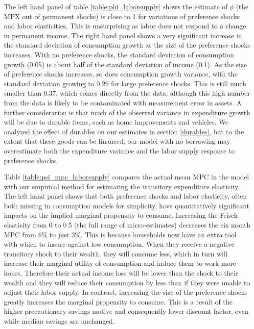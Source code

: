 \documentclass[titlepage]{\econtex}\newcommand{\texname}{ConsumptionHeterogeneity}
\begin{document}
The left hand panel of table \ref{table:phi_laborsupply} shows the estimate of $\phi$ (the MPX out of permanent shocks) is close to 1 for variations of preference shocks and labor elasticities. This is unsurprising as labor does not respond to a change in permanent income. The right hand panel shows a very significant increase in the standard deviation of consumption growth as the size of the preference shocks increases. With no preference shocks, the standard deviation of consumption growth (0.05) is about half of the standard deviation of income (0.1). As the size of preference shocks increases, so does consumption growth variance, with the standard deviation growing to 0.26 for large preference shocks. This is still much smaller than 0.37, which comes directly from the data, although this high number from the data is likely to be contaminated with measurement error in assets. A further consideration is that much of the observed variance in expenditure growth will be due to durable items, such as home improvements and vehicles. We analyzed the effect of durables on our estimates in section \ref{durables}, but to the extent that these goods can be financed, our model with no borrowing may overestimate both the expenditure variance and the labor supply response to preference shocks.

Table \ref{table:psi_mpc_laborsupply} compares the actual mean MPC in the model with our empirical method for estimating the transitory expenditure elasticity. The left hand panel shows that both preference shocks and labor elasticity, often both missing in consumption models for simplicity, have quantitatively significant impacts on the implied marginal propensity to consume. Increasing the Frisch elasticity from 0 to 0.5 (the full range of micro-estimates) decreases the six month MPC from 6\% to just 3\%. This is because households now have an extra tool with which to insure against low consumption. When they receive a negative transitory shock to their wealth, they will consume less, which in turn will increase their marginal utility of consumption and induce them to work more hours. Therefore their actual income loss will be lower than the shock to their wealth and they will reduce their consumption by less than if they were unable to adjust their labor supply. In contrast, increasing the size of the preference shocks greatly increases the marginal propensity to consume. This is a result of the higher precautionary savings motive and consequently lower discount factor, even while median savings are unchanged.
\end{document}
